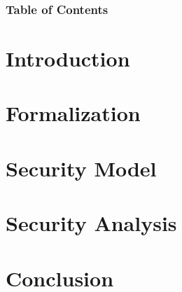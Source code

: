 




\usepackage[
    backend=biber,
    style=alphabetic,
    sorting=ynt
]{biblatex}


\renewcommand*{\bibfont}{\scriptsize}





\begin{frame}
\maketitle
\end{frame}


\begin{frame}
\frametitle{Table of Contents}
\tableofcontents[hideothersubsections]

\end{frame}

\section{Introduction}



\section{Formalization}



\section{Security Model}



\section{Security Analysis}



\section{Conclusion}

